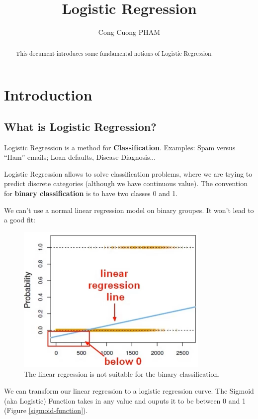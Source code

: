 \documentclass{article}
\begin{document}
\title{Logistic Regression}
\author{Cong Cuong PHAM}

\maketitle

\begin{abstract}
This document introduces some fundamental notions of Logistic Regression.
\end{abstract}

\section{Introduction}
\subsection{What is Logistic Regression?}
\par Logistic Regression is a method for {\bf{Classification}}. Examples: Spam versus ``Ham'' emails; Loan defaults, Disease Diagnosis...

\par Logistic Regression allows to solve classification problems, where we are trying to predict discrete categories (although we have continuous value). The convention for {\bf{binary classification}} is to have two classes 0 and 1.

\par We can't use a normal linear regression model on binary groupes. It won't lead to a good fit:

\begin{figure}[H]
\centering
\includegraphics[width=.6\linewidth]{pic/linear_regression-binary_classification.png}
\caption{The linear regression is not suitable for the binary classification.}
\end{figure}

\par We can transform our linear regression to a logistic regression curve. The Sigmoid (aka Logistic) Function takes in any value and ouputs it to be between 0 and 1 (Figure \ref{sigmoid-function}).
\end{document}

